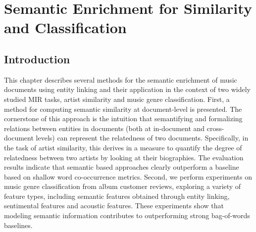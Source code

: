 

\chapter[Semantic Enrichment for Similarity and Classification][Semantic Enrichment for Sim. and Classif.]{Semantic Enrichment for Similarity and Classification}
\label{sec:similarity}

\section{Introduction}\label{sec:similarity:introduction} %

This chapter describes several methods for the semantic enrichment of music documents using entity linking and their application in the context of two widely studied MIR tasks, artist similarity and music genre classification. 
First, a method for computing semantic similarity at document-level is presented. The cornerstone of this approach is the intuition that semantifying and formalizing relations between entities in documents (both at in-document and cross-document levels) can represent the relatedness of two documents. Specifically, in the task of artist similarity, this derives in a measure to quantify the degree of relatedness between two artists by looking at their biographies. The evaluation results indicate that semantic based approaches clearly outperform a baseline based on shallow word co-occurrence metrics.
Second, we perform experiments on music genre classification from album customer reviews, exploring a variety of feature types, including semantic features obtained through entity linking, sentimental features  and acoustic features. These experiments show that modeling semantic information contributes to outperforming strong bag-of-words baselines. 

